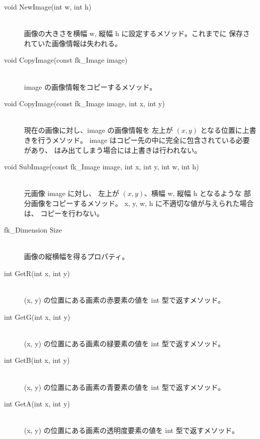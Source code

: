\begin{description}
\item[void NewImage(int w, int h)] ~ \\
	画像の大きさを横幅 w, 縦幅 h に設定するメソッド。これまでに
	保存されていた画像情報は失われる。\\

\item[void CopyImage(const fk\_Image image)] ~ \\
	image の画像情報をコピーするメソッド。\\

\item[void CopyImage(const fk\_Image image, int x, int y)] ~ \\
	現在の画像に対し、image の画像情報を
	左上が \((x, y)\) となる位置に上書きを行うメソッド。
	image はコピー先の中に完全に包含されている必要があり、
	はみ出てしまう場合には上書きは行われない。\\

\item[void SubImage(const fk\_Image image, int x, int y, int w, int h)] ~ \\
	元画像 image に対し、
	左上が \((x, y)\)、横幅 w, 縦幅 h となるような
	部分画像をコピーするメソッド。
	x, y, w, h に不適切な値が与えられた場合は、
	コピーを行わない。\\

\item[fk\_Dimension Size] ~ \\
	画像の縦横幅を得るプロパティ。\\

\item[int GetR(int x, int y)] ~ \\
	(x, y) の位置にある画素の赤要素の値を int 型で返すメソッド。\\

\item[int GetG(int x, int y)] ~ \\
	(x, y) の位置にある画素の緑要素の値を int 型で返すメソッド。\\

\item[int GetB(int x, int y)] ~ \\
	(x, y) の位置にある画素の青要素の値を int 型で返すメソッド。\\

\item[int GetA(int x, int y)] ~ \\
	(x, y) の位置にある画素の透明度要素の値を int 型で返すメソッド。\\


\end{description}
